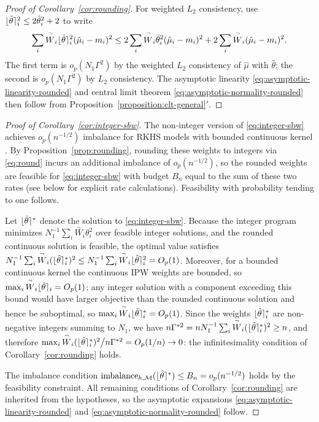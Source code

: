 \documentclass{article}
\theoremstyle{definition}
\DeclarePairedDelimiter\round{\lfloor}{\rceil}
\DeclareMathOperator{\imbalance}{imbalance}
\newcommand{\htheta}{\hat\theta}
\newcommand{\model}{\mathcal{M}}
\newcommand{\<}{\langle}
\renewcommand{\>}{\rangle}
\begin{document}
\begin{refsection}
\begin{proof}[Proof of Corollary~\ref{cor:rounding}]
For weighted $L_2$ consistency, use $\round{\htheta}_i^2 \le 2\htheta_i^2 + 2$ to write
\[
\sum_i \overset{\neg}{W}_i \round{\htheta}_i^2 (\hat\mu_i - m_i)^2 \le 2\sum_i \overset{\neg}{W}_i \htheta_i^2 (\hat\mu_i - m_i)^2 + 2\sum_i \overset{\neg}{W}_i (\hat\mu_i - m_i)^2.
\]
The first term is $o_p(N_1 \Gamma^2)$ by the weighted $L_2$ consistency of $\hat\mu$ with $\htheta$; the second is $o_p(N_1\Gamma^2)$ by $L_2$ consistency. The asymptotic linearity \eqref{eq:asymptotic-linearity-rounded} and central limit theorem \eqref{eq:asymptotic-normality-rounded} then follow from Proposition~\ref{proposition:clt-general}$'$.
\end{proof}

\begin{proof}[Proof of Corollary~\ref{cor:integer-sbw}]
The non-integer version of \eqref{eq:integer-sbw} achieves $o_p(n^{-1/2})$ imbalance for RKHS models with bounded continuous kernel \citep[Theorem 2]{hirshberg2019minimax}.
By Proposition~\ref{prop:rounding}, rounding these weights to integers via \eqref{eq:round} incurs an additional imbalance of $o_p(n^{-1/2})$, so the rounded weights are feasible for \eqref{eq:integer-sbw} with budget $B_n$ equal to the sum of these two rates (see below for explicit rate calculations). Feasibility with probability tending to one follows.

Let $\round{\htheta}^*$ denote the solution to \eqref{eq:integer-sbw}. Because the integer program minimizes $N_1^{-1}\sum_i \overset{\neg}{W}_i \theta_i^2$ over feasible integer solutions, and the rounded continuous solution is feasible, the optimal value satisfies $N_1^{-1}\sum_i \overset{\neg}{W}_i (\round{\htheta}^*_i)^2 \le N_1^{-1}\sum_i \overset{\neg}{W}_i \round{\htheta}_i^2 = O_p(1)$. Moreover, for a bounded continuous kernel the continuous IPW weights are bounded, so $\max_i \overset{\neg}{W}_i \round{\htheta}_i = O_p(1)$; any integer solution with a component exceeding this bound would have larger objective than the rounded continuous solution and hence be suboptimal, so $\max_i \overset{\neg}{W}_i \round{\htheta}^*_i = O_p(1)$. Since the weights $\round{\htheta}^*_i$ are non-negative integers summing to $N_1$, we have $n\Gamma^{*2} = n N_1^{-1}\sum_i \overset{\neg}{W}_i (\round{\htheta}^*_i)^2 \ge n$, and therefore $\max_i \overset{\neg}{W}_i (\round{\htheta}^*_i)^2 \big/ n\Gamma^{*2} = O_p(1/n) \to 0$: the infinitesimality condition of Corollary~\ref{cor:rounding} holds.

The imbalance condition $\imbalance_{h,\model}(\round{\htheta}^*) \le B_n = o_p(n^{-1/2})$ holds by the feasibility constraint. All remaining conditions of Corollary~\ref{cor:rounding} are inherited from the hypotheses, so the asymptotic expansions \eqref{eq:asymptotic-linearity-rounded} and \eqref{eq:asymptotic-normality-rounded} follow.
\end{proof}


\end{refsection}
\end{document}
